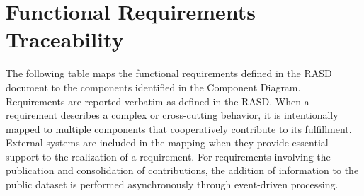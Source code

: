 \section{Functional Requirements Traceability}
\label{sec:functional_requirements_traceability}

The following table maps the functional requirements defined in the RASD document to the components identified in the Component Diagram. Requirements are reported verbatim as defined in the RASD. When a requirement describes a complex or cross-cutting behavior, it is intentionally mapped to multiple components that cooperatively contribute to its fulfillment. External systems are included in the mapping when they provide essential support to the realization of a requirement.
For requirements involving the publication and consolidation of contributions, the addition of information to the public dataset is performed asynchronously through event-driven processing.



